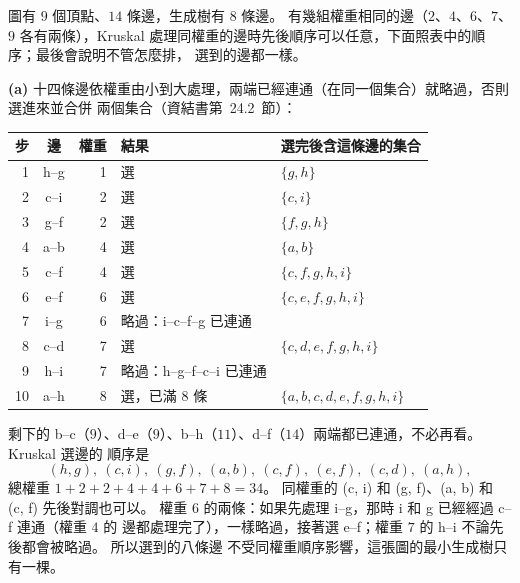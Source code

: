 \begin{pastsoln}
圖有 $9$ 個頂點、$14$ 條邊，生成樹有 $8$ 條邊。 有幾組權重相同的邊（$2$、$4$、$6$、$7$、$9$
各有兩條），Kruskal 處理同權重的邊時先後順序可以任意，下面照表中的順序；最後會說明不管怎麼排，
選到的邊都一樣。

\textbf{(a)} 十四條邊依權重由小到大處理，兩端已經連通（在同一個集合）就略過，否則選進來並合併
兩個集合（資結書第~24.2~節）：
\begin{center}
\small
\begin{tabular}{rcrll}
\toprule
步 & 邊 & 權重 & 結果 & 選完後含這條邊的集合 \\
\midrule
1 & h--g & 1 & 選 & $\{g, h\}$ \\
2 & c--i & 2 & 選 & $\{c, i\}$ \\
3 & g--f & 2 & 選 & $\{f, g, h\}$ \\
4 & a--b & 4 & 選 & $\{a, b\}$ \\
5 & c--f & 4 & 選 & $\{c, f, g, h, i\}$ \\
6 & e--f & 6 & 選 & $\{c, e, f, g, h, i\}$ \\
7 & i--g & 6 & 略過：i--c--f--g 已連通 & \\
8 & c--d & 7 & 選 & $\{c, d, e, f, g, h, i\}$ \\
9 & h--i & 7 & 略過：h--g--f--c--i 已連通 & \\
10 & a--h & 8 & 選，已滿 $8$ 條 & $\{a, b, c, d, e, f, g, h, i\}$ \\
\bottomrule
\end{tabular}
\end{center}
剩下的 b--c（$9$）、d--e（$9$）、b--h（$11$）、d--f（$14$）兩端都已連通，不必再看。 Kruskal 選邊的
順序是
\[
(h, g),\ (c, i),\ (g, f),\ (a, b),\ (c, f),\ (e, f),\ (c, d),\ (a, h),
\]
總權重 $1 + 2 + 2 + 4 + 4 + 6 + 7 + 8 = 34$。 同權重的 (c, i) 和 (g, f)、(a, b) 和 (c, f)
先後對調也可以。 權重 $6$ 的兩條：如果先處理 i--g，那時 i 和 g 已經經過 c--f 連通（權重 $4$ 的
邊都處理完了），一樣略過，接著選 e--f；權重 $7$ 的 h--i 不論先後都會被略過。 所以選到的八條邊
不受同權重順序影響，這張圖的最小生成樹只有一棵。


\end{pastsoln}
